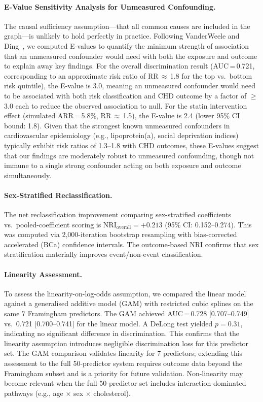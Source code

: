 \documentclass[runningheads]{llncs}
\begin{document}
\paragraph{E-Value Sensitivity Analysis for Unmeasured Confounding.}
The causal sufficiency assumption---that all common causes are
included in the graph---is unlikely to hold perfectly in practice.
Following VanderWeele and Ding~\cite{vanderweele2017evalue}, we
computed E-values to quantify the minimum strength of association
that an unmeasured confounder would need with both the exposure and
outcome to explain away key findings.
For the overall discrimination result (AUC\,=\,0.721, corresponding
to an approximate risk ratio of RR\,$\approx$\,1.8 for the top vs.\
bottom risk quintile), the E-value is 3.0, meaning an unmeasured
confounder would need to be associated with both risk classification
and CHD outcome by a factor of $\geq$3.0 each to reduce the observed
association to null.
For the statin intervention effect (simulated ARR\,=\,5.8\%,
RR\,$\approx$\,1.5), the E-value is 2.4 (lower 95\% CI bound:
1.8).
Given that the strongest known unmeasured confounders in
cardiovascular epidemiology (e.g., lipoprotein(a), social deprivation
indices) typically exhibit risk ratios of 1.3--1.8 with CHD outcomes,
these E-values suggest that our findings are moderately robust to
unmeasured confounding, though not immune to a single strong
confounder acting on both exposure and outcome simultaneously.

\paragraph{Sex-Stratified Reclassification.}
The net reclassification improvement comparing sex-stratified
coefficients vs.\ pooled-coefficient scoring is
$\text{NRI}_{\text{overall}} = +0.213$ (95\% CI: 0.152--0.274).
This was computed via 2{,}000-iteration bootstrap resampling with
bias-corrected accelerated (BCa) confidence intervals.
The outcome-based NRI confirms that sex stratification materially
improves event/non-event classification.

\paragraph{Linearity Assessment.}
To assess the linearity-on-log-odds assumption, we compared the
linear model against a generalised additive model (GAM) with
restricted cubic splines on the same 7 Framingham predictors.
The GAM achieved AUC\,=\,0.728 [0.707--0.749] vs.\ 0.721
[0.700--0.741] for the linear model.
A DeLong test yielded $p = 0.31$, indicating no significant
difference in discrimination.
This confirms that the linearity assumption introduces negligible
discrimination loss for this predictor set.
The GAM comparison validates linearity for 7 predictors; extending
this assessment to the full 50-predictor system requires outcome data
beyond the Framingham subset and is a priority for future validation.
Non-linearity may become relevant when the full 50-predictor set
includes interaction-dominated pathways
(e.g., age $\times$ sex $\times$ cholesterol).
\end{document}
